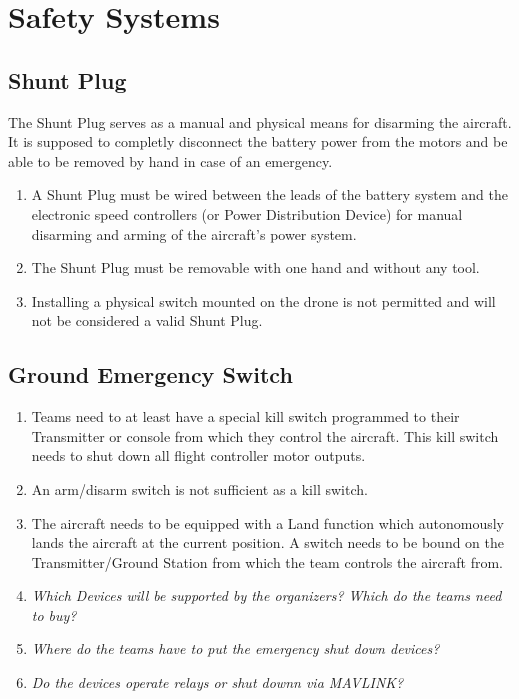 \documentclass{article}
\begin{document}
\section{Safety Systems}

\subsection{Shunt Plug}
The Shunt Plug serves as a manual and physical means for disarming the aircraft. It is supposed to completly disconnect the battery power from the motors and be able to be removed by hand in case of an emergency.
\begin{enumerate}
  \item A Shunt Plug must be wired between the leads of the battery system and the electronic speed controllers (or Power Distribution Device) for manual disarming and arming of the aircraft's power system.
  \item The Shunt Plug must be removable with one hand and without any tool.
  \item Installing a physical switch mounted on the drone is not permitted and will not be considered a valid Shunt Plug.
  \end{enumerate}
  
  
  

\subsection{Ground Emergency Switch}
\begin{enumerate}
  \item Teams need to at least have a special kill switch programmed to their Transmitter or console from which they control the aircraft. This kill switch needs to shut down all flight controller motor outputs. 
  \item An arm/disarm switch is not sufficient as a kill switch.
  \item The aircraft needs to be equipped with a Land function which autonomously lands the aircraft at the current position. A switch needs to be bound on the Transmitter/Ground Station from which the team controls the aircraft from.  
  \item \emph{Which Devices will be supported by the organizers? Which do the teams need to buy?}
  \item \emph{Where do the teams have to put the emergency shut down devices?}
  \item \emph{Do the devices operate relays or shut downn via MAVLINK?}
\end{enumerate}
\end{document}
